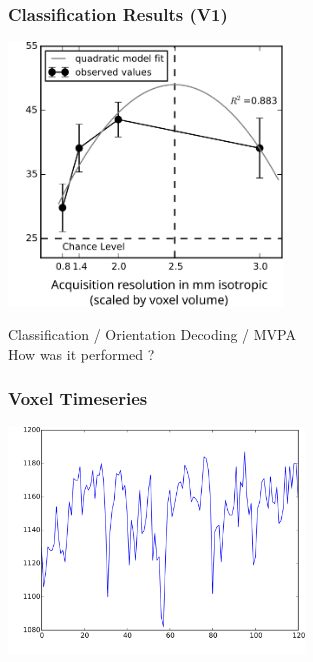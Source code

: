 \documentclass{beamer}
\begin{document}
  \begin{frame}
    \frametitle{Classification Results (V1)}
        \begin{center}
            \includegraphics[height=7cm]{../pictures/classification}
        \end{center}
    \end{frame}

  \begin{frame}
        \begin{center}
            Classification / Orientation Decoding / MVPA \\ How was it performed ?
        \end{center}
    \end{frame} 

  \begin{frame}
    \frametitle{Voxel Timeseries}
        \begin{center}
            \includegraphics[height=6cm]{../pictures/time_series1}
        \end{center}
    \end{frame}
\end{document}
